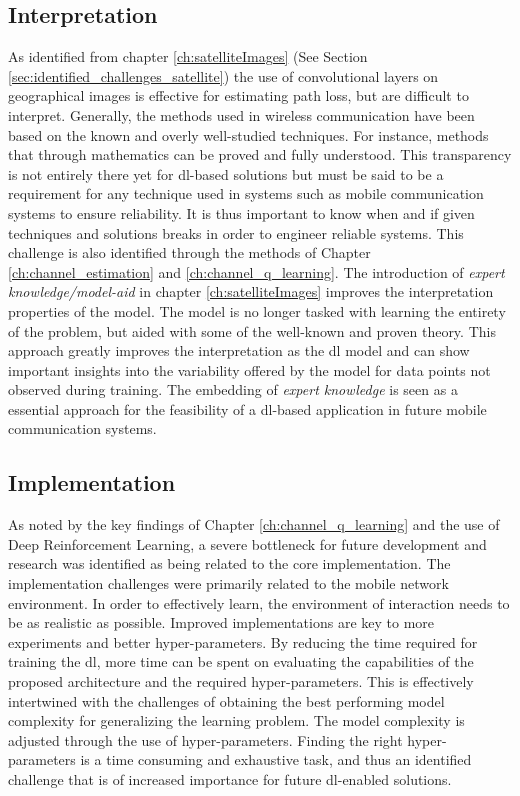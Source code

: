 \subsection{Interpretation}
As identified from chapter \ref{ch:satelliteImages} (See Section \ref{sec:identified_challenges_satellite}) the use of convolutional layers on geographical images is effective for estimating path loss, but are difficult to interpret. Generally, the methods used in wireless communication have been based on the known and overly well-studied techniques. For instance, methods that through mathematics can be proved and fully understood. This transparency is not entirely there yet for \gls{dl}-based solutions \cite{Samek2017ExplainableModels} but must be said to be a  requirement for any technique used in systems such as mobile communication systems to ensure reliability. It is thus important to know when and if given techniques and solutions breaks in order to engineer reliable systems. This challenge is also identified through the methods of Chapter \ref{ch:channel_estimation} and \ref{ch:channel_q_learning}. The introduction of \emph{expert knowledge/model-aid} in chapter \ref{ch:satelliteImages} improves the interpretation properties of the model. The model is no longer tasked with learning the entirety of the problem, but aided with some of the well-known and proven theory. This approach greatly improves the interpretation as the \gls{dl} model and can show important insights into the variability offered by the model for data points not observed during training. The embedding of \emph{expert knowledge} is seen as a essential approach for the feasibility of a \gls{dl}-based  application in future mobile communication systems.

\subsection{Implementation}
As noted by the key findings of Chapter \ref{ch:channel_q_learning} and the use of Deep Reinforcement Learning, a severe bottleneck for future development and research was identified as being related to the core implementation. The implementation challenges were primarily related to the mobile network environment. In order to effectively learn, the environment of interaction needs to be as realistic as possible. Improved implementations are key to more experiments and better hyper-parameters. By reducing the time required for training the \gls{dl}, more time can be spent on evaluating the capabilities of the proposed architecture and the required hyper-parameters. This is effectively intertwined with the challenges of obtaining the best performing model complexity for generalizing the learning problem. The model complexity is adjusted through the use of hyper-parameters. Finding the right hyper-parameters is a time consuming and exhaustive task, and thus an identified challenge that is of increased importance for future \gls{dl}-enabled solutions.

